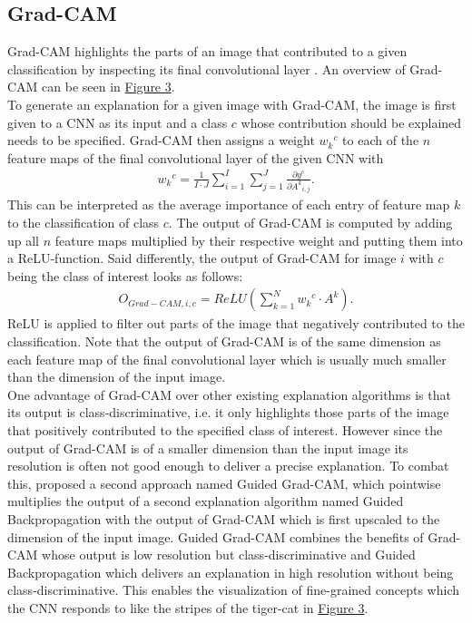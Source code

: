 \documentclass{article}
\begin{document}
\subsection{Grad-CAM}
Grad-CAM highlights the parts of an image that contributed to a given classification by inspecting its
final convolutional layer \cite{Selvaraju_2017_ICCV}. An overview of Grad-CAM can be seen in \hyperref[fig:gradcam]{Figure 3}. \\
To generate an explanation for a given image with Grad-CAM, the image is first given to a CNN as its input
and a class $c$ whose contribution should be explained needs to be specified. Grad-CAM then assigns a weight
${w_k}^c$ to each of the $n$ feature maps of the final convolutional layer of the given CNN with
\begin{align*}
    {w_k}^c = \frac{1}{I \cdot J} \sum\limits_{i=1}^{I} \sum\limits_{j=1}^J \frac{\partial y^c}{\partial {A^k}_{i,j}}.
\end{align*}
This can be interpreted as the average importance of each entry of feature map $k$ to the classification of class $c$.
The output of Grad-CAM is computed by adding up all $n$ feature maps multiplied by their respective weight and putting
them into a ReLU-function. Said differently, the output of Grad-CAM for image $i$ with $c$ being the class of interest looks as follows:
\begin{align*}
    O_{Grad-CAM, i, c} = ReLU(\sum\limits_{k=1}^N {w_k}^c \cdot A^k).
\end{align*}
ReLU is applied to filter out parts of the image that
negatively contributed to the classification. Note that the output of Grad-CAM is of the same dimension as each
feature map of the final convolutional layer which is usually much smaller than the dimension of the input image. \\
One advantage of Grad-CAM over other existing explanation algorithms is that its output is class-discriminative,
i.e. it only highlights those parts of the image that positively contributed to the specified class of interest.
However since the output of Grad-CAM is of a smaller dimension than the input image its resolution is often not good enough
to deliver a precise explanation. To combat this, \cite{Selvaraju_2017_ICCV} proposed a second approach named Guided Grad-CAM,
which pointwise multiplies the output of a second explanation algorithm named Guided Backpropagation \cite{springenberg2015striving}
with the output of Grad-CAM which is first upscaled to the dimension of the input image. 
Guided Grad-CAM combines the benefits of Grad-CAM whose output is low resolution but class-discriminative and
Guided Backpropagation which delivers an explanation in high resolution without being class-discriminative.
This enables the visualization of fine-grained concepts which the CNN responds to like
the stripes of the tiger-cat in \hyperref[fig:gradcam]{Figure 3}. \\
\end{document}
